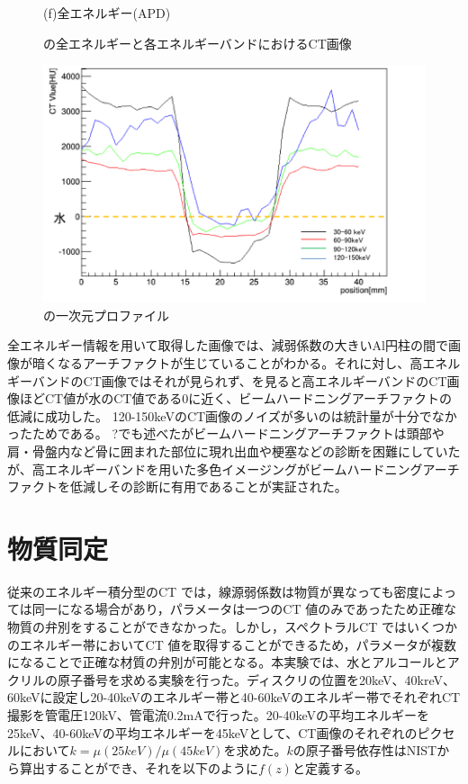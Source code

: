 \begin{figure}[H]
\begin{minipage}{0.5\hsize}
\begin{center}
  \end{center}  
\vspace{-1cm}
\caption*{(f)全エネルギー(APD)}
 \end{minipage}
 \begin{center}
  \caption{の全エネルギーと各エネルギーバンドにおけるCT画像}
  \label{fig:BH_multi}
  \end{center}
\end{figure}

\begin{figure}[H]
 \begin{center}
 \includegraphics[bb=0.000000 0.000000 422.365084 263.018257,width=0.6\hsize]{image2/chapter5/BH_slice.png} 
 \end{center}
 \caption{の一次元プロファイル}
 \label{fig:BH_slice}
\end{figure}

全エネルギー情報を用いて取得した画像では、減弱係数の大きいAl円柱の間で画像が暗くなるアーチファクトが生じていることがわかる。それに対し、高エネルギーバンドのCT画像ではそれが見られず、を見ると高エネルギーバンドのCT画像ほどCT値が水のCT値である0に近く、ビームハードニングアーチファクトの低減に成功した。
120-150keVのCT画像のノイズが多いのは統計量が十分でなかったためである。
?でも述べたがビームハードニングアーチファクトは頭部や肩・骨盤内など骨に囲まれた部位に現れ出血や梗塞などの診断を困難にしていたが、高エネルギーバンドを用いた多色イメージングがビームハードニングアーチファクトを低減しその診断に有用であることが実証された。


\section{物質同定}
従来のエネルギー積分型のCT では，線源弱係数は物質が異なっても密度によっては同一になる場合があり，パラメータは一つのCT 値のみであったため正確な物質の弁別をすることができなかった。しかし，スペクトラルCT ではいくつかのエネルギー帯においてCT 値を取得することができるため，パラメータが複数になることで正確な材質の弁別が可能となる。本実験では、水とアルコールとアクリルの原子番号を求める実験を行った。ディスクリの位置を20keV、40kreV、60keVに設定し20-40keVのエネルギー帯と40-60keVのエネルギー帯でそれぞれCT撮影を管電圧120kV、管電流0.2mAで行った。20-40keVの平均エネルギーを25keV、40-60keVの平均エネルギーを45keVとして、CT画像のそれぞれのピクセルにおいて$k=\mu(25keV)/\mu(45keV)$を求めた。$k$の原子番号依存性はNISTから算出することができ、それを以下のように$f(z)$と定義する。

